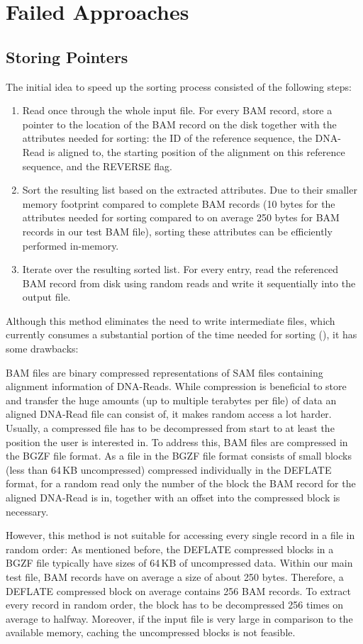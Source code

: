 \section{Failed Approaches}
\subsection{Storing Pointers}
The initial idea to speed up the sorting process consisted of the following steps: 
\begin{enumerate}
    \item Read once through the whole input file. For every BAM record, store a pointer to the location of the BAM record on the disk together with the attributes needed for sorting: the ID of the reference sequence, the DNA-Read is aligned to, the starting position of the alignment on this reference sequence, and the REVERSE flag.
    \item Sort the resulting list based on the extracted attributes. Due to their smaller memory footprint compared to complete BAM records (10 bytes for the attributes needed for sorting compared to on average 250 bytes for BAM records in our test BAM file), sorting these attributes can be efficiently performed in-memory.
    \item Iterate over the resulting sorted list. For every entry, read the referenced BAM record from disk using random reads and write it sequentially into the output file.
\end{enumerate}
Although this method eliminates the need to write intermediate files, which currently consumes a substantial portion of the time needed for sorting (), it has some drawbacks: 

BAM files are binary compressed representations of SAM files containing alignment information of DNA-Reads. While compression is beneficial to store and transfer the huge amounts (up to multiple terabytes per file) of data an aligned DNA-Read file can consist of, it makes random access a lot harder. Usually, a compressed file has to be decompressed from start to at least the position the user is interested in. To address this, BAM files are compressed in the BGZF file format. As a file in the BGZF file format consists of small blocks (less than 64\,KB uncompressed) compressed individually in the  DEFLATE format, for a random read only the number of the block the BAM record for the aligned DNA-Read is in, together with an offset into the compressed block is necessary. 

However, this method is not suitable for accessing every single record in a file in random order:
As mentioned before, the DEFLATE compressed blocks in a BGZF file typically have sizes of 64\,KB of uncompressed data. Within our main test file, BAM records have on average a size of about 250 bytes. Therefore, a DEFLATE compressed block on average contains 256 BAM records. To extract every record in random order, the block has to be decompressed 256 times on average to halfway. Moreover, if the input file is very large in comparison to the available memory, caching  the uncompressed blocks is not feasible. 

